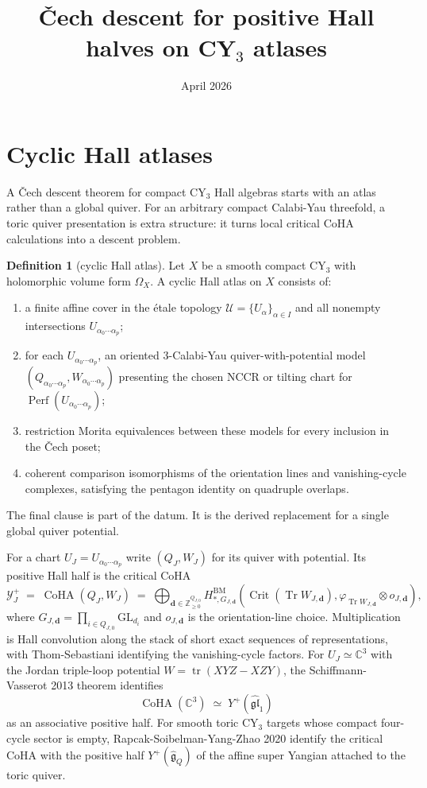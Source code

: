\documentclass[11pt]{article}
\title{\v{C}ech descent for positive Hall halves on CY$_3$ atlases}
\author{}
\date{April 2026}
\providecommand{\CC}{\mathbb{C}}
\providecommand{\ZZ}{\mathbb{Z}}
\providecommand{\cU}{\mathcal{U}}
\providecommand{\cY}{\mathcal{Y}}
\providecommand{\Crit}{\operatorname{Crit}}
\providecommand{\CoHA}{\operatorname{CoHA}}
\providecommand{\Perf}{\operatorname{Perf}}
\theoremstyle{definition}
\newtheorem{definition}[theorem]{Definition}
\theoremstyle{remark}
\begin{document}
\maketitle

\section{Cyclic Hall atlases}

A \v{C}ech descent theorem for compact CY$_3$ Hall algebras starts with
an atlas rather than a global quiver. For an arbitrary compact
Calabi-Yau threefold, a toric quiver presentation is extra structure:
it turns local critical CoHA calculations into a descent problem.

\begin{definition}[cyclic Hall atlas]\label{def:cyclic-hall-atlas}
Let $X$ be a smooth compact CY$_3$ with holomorphic volume form
$\Omega_X$. A cyclic Hall atlas on $X$ consists of:
\begin{enumerate}
\item a finite affine cover in the \'etale topology
$\cU=\{U_\alpha\}_{\alpha\in I}$ and all nonempty intersections
$U_{\alpha_0\cdots\alpha_p}$;
\item for each $U_{\alpha_0\cdots\alpha_p}$, an oriented $3$-Calabi-Yau
quiver-with-potential model $(Q_{\alpha_0\cdots\alpha_p},
W_{\alpha_0\cdots\alpha_p})$ presenting the chosen NCCR or tilting chart
for $\Perf(U_{\alpha_0\cdots\alpha_p})$;
\item restriction Morita equivalences between these models for every
inclusion in the \v{C}ech poset;
\item coherent comparison isomorphisms of the orientation lines and
vanishing-cycle complexes, satisfying the pentagon identity on quadruple
overlaps.
\end{enumerate}
The final clause is part of the datum. It is the derived replacement for
a single global quiver potential.
\end{definition}

For a chart $U_J=U_{\alpha_0\cdots\alpha_p}$ write
$(Q_J,W_J)$ for its quiver with potential. Its positive Hall half is
the critical CoHA
\[
\cY^+_J
\;=\;
\CoHA(Q_J,W_J)
\;=\;
\bigoplus_{\mathbf d\in\ZZ_{\geq0}^{Q_{J,0}}}
H^{\mathrm{BM}}_{*,G_{J,\mathbf d}}\!\left(
\Crit(\operatorname{Tr}W_{J,\mathbf d}),
\varphi_{\operatorname{Tr}W_{J,\mathbf d}}\otimes o_{J,\mathbf d}
\right),
\]
where $G_{J,\mathbf d}=\prod_{i\in Q_{J,0}}\mathrm{GL}_{d_i}$ and
$o_{J,\mathbf d}$ is the orientation-line choice. Multiplication is Hall
convolution along the stack of short exact sequences of representations,
with Thom-Sebastiani identifying the vanishing-cycle factors. For
$U_J\simeq\CC^3$ with the Jordan triple-loop potential
$W=\operatorname{tr}(XYZ-XZY)$, the Schiffmann-Vasserot 2013 theorem
identifies
\[
\CoHA(\CC^3)\;\simeq\;Y^+(\widehat{\mathfrak{gl}}_1)
\]
as an associative positive half. For smooth toric CY$_3$ targets whose
compact four-cycle sector is empty, Rapcak-Soibelman-Yang-Zhao 2020
identify the critical CoHA with the positive half
$Y^+(\widehat{\mathfrak g}_{Q})$ of the affine super Yangian attached to
the toric quiver.
\end{document}
